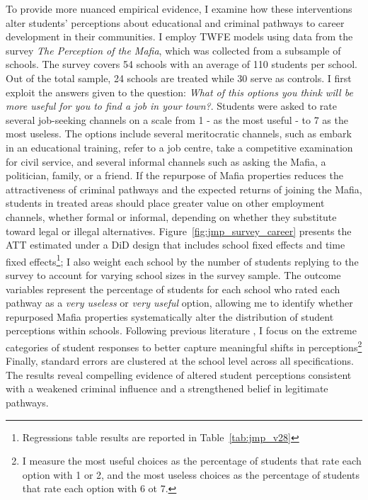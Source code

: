 \documentclass[12pt]{article}
\theoremstyle{plain}
\theoremstyle{plain}
\theoremstyle{plain}
\theoremstyle{definition}
\theoremstyle{plain}
\theoremstyle{definition}
\theoremstyle{plain}
\theoremstyle{remark}
\theoremstyle{definition}
\theoremstyle{definition}
\theoremstyle{plain}
\begin{document}
	To provide more nuanced empirical evidence, I examine how these interventions alter students' perceptions about educational and criminal pathways to career development in their communities. I employ TWFE models using data from the survey \emph{The Perception of the Mafia}, which was collected from a subsample of schools. The survey covers 54 schools with an average of 110 students per school. Out of the total sample, 24 schools are treated while 30 serve as controls.
	I first exploit the answers given to the question: \emph{What of this options you think will be more useful for you to find a job in your town?}. Students were asked to rate several job-seeking channels on a scale from 1 - as the most useful - to 7 as the most useless. The options include several meritocratic channels, such as embark in an educational training, refer to a job centre, take a competitive examination for civil service, and several informal channels such as asking the Mafia, a politician, family, or a friend. If the repurpose of Mafia properties reduces the attractiveness of criminal pathways and the expected returns of joining the Mafia, students in treated areas should place greater value on other employment channels, whether formal or informal, depending on whether they substitute toward legal or illegal alternatives.
	Figure~\ref{fig:jmp_survey_career} presents the ATT estimated under a DiD design that includes school fixed effects and time fixed effects\footnote{Regressions table results are reported in Table~\ref{tab:jmp_v28}}; I also weight each school by the number of students replying to the survey to account for varying school sizes in the survey sample. The outcome variables represent the percentage of students for each school who rated each pathway as a \emph{very useless}  or \emph{very useful} option, allowing me to identify whether repurposed Mafia properties systematically alter the distribution of student perceptions within schools. Following previous literature \citep{villa_effect_2025}, I focus on the extreme categories of student responses to better capture meaningful shifts in perceptions\footnote{I measure the most useful choices as the percentage of students that rate each option with 1 or 2, and the most useless choices as the percentage of students that rate each option with 6 ot 7.} Finally, standard errors are clustered at the school level across all specifications. \\
	The results reveal compelling evidence of altered student perceptions consistent with a weakened criminal influence and a strengthened belief in legitimate pathways. 
\end{document}
